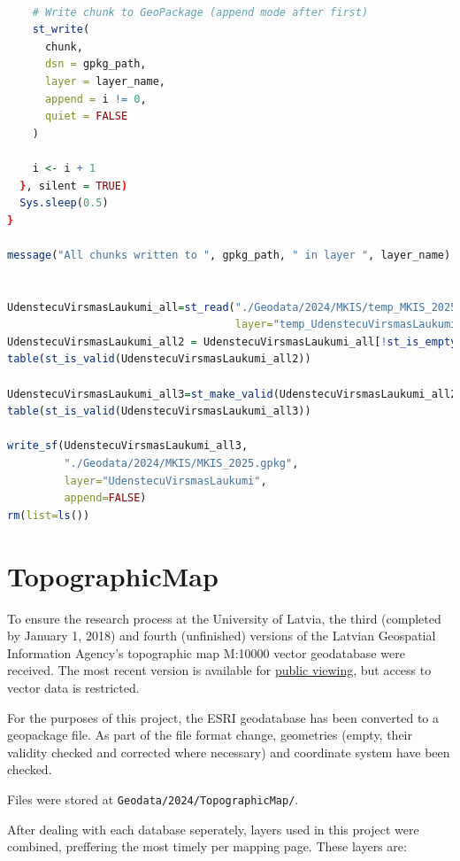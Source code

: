 \documentclass[
]{book}
\newcommand{\passthrough}[1]{#1}
\begin{document}
\begin{lstlisting}[language=R]
    
    # Write chunk to GeoPackage (append mode after first)
    st_write(
      chunk, 
      dsn = gpkg_path,
      layer = layer_name,
      append = i != 0,
      quiet = FALSE
    )
    
    i <- i + 1
  }, silent = TRUE)
  Sys.sleep(0.5)
}

message("All chunks written to ", gpkg_path, " in layer ", layer_name)


UdenstecuVirsmasLaukumi_all=st_read("./Geodata/2024/MKIS/temp_MKIS_2025.gpkg",
                                    layer="temp_UdenstecuVirsmasLaukumi")
UdenstecuVirsmasLaukumi_all2 = UdenstecuVirsmasLaukumi_all[!st_is_empty(UdenstecuVirsmasLaukumi_all),,drop=FALSE] # 0
table(st_is_valid(UdenstecuVirsmasLaukumi_all2))

UdenstecuVirsmasLaukumi_all3=st_make_valid(UdenstecuVirsmasLaukumi_all2)
table(st_is_valid(UdenstecuVirsmasLaukumi_all3))

write_sf(UdenstecuVirsmasLaukumi_all3,
         "./Geodata/2024/MKIS/MKIS_2025.gpkg",
         layer="UdenstecuVirsmasLaukumi",
         append=FALSE)
rm(list=ls())
\end{lstlisting}

\section{TopographicMap}\label{Ch04.04}

To ensure the research process at the University of Latvia, the third (completed
by January 1, 2018) and fourth (unfinished) versions of the Latvian Geospatial
Information Agency's topographic map M:10000 vector geodatabase were received.
The most recent version is available for \href{https://kartes.lgia.gov.lv/karte/?x=311986.74&y=506887.35&zoom=3&basemap=topokarte}{public viewing},
but access to vector data is restricted.

For the purposes of this project, the ESRI geodatabase has been converted to a
geopackage file. As part of the file format change, geometries (empty, their
validity checked and corrected where necessary) and coordinate system have
been checked.

Files were stored at \passthrough{\lstinline!Geodata/2024/TopographicMap/!}.

After dealing with each database seperately, layers used in this project were
combined, preffering the most timely per mapping page. These layers are:
\end{document}
